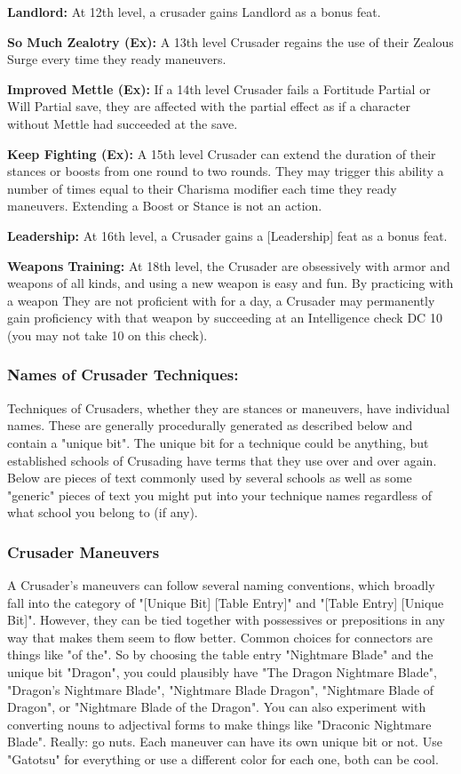 \textbf{Landlord:} At 12th level, a crusader gains Landlord as a bonus feat.

\textbf{So Much Zealotry (Ex):} A 13th level Crusader regains the use of their Zealous Surge every time they ready maneuvers.

\textbf{Improved Mettle (Ex):} If a 14th level Crusader fails a Fortitude Partial or Will Partial save, they are affected with the partial effect as if a character without Mettle had succeeded at the save.

\textbf{Keep Fighting (Ex):} A 15th level Crusader can extend the duration of their stances or boosts from one round to two rounds. They may trigger this ability a number of times equal to their Charisma modifier each time they ready maneuvers. Extending a Boost or Stance is not an action.

\textbf{Leadership:} At 16th level, a Crusader gains a [Leadership] feat as a bonus feat.

\textbf{Weapons Training:} At 18th level, the Crusader are obsessively with armor and weapons of all kinds, and using a new weapon is easy and fun. By practicing with a weapon They are not proficient with for a day, a Crusader may permanently gain proficiency with that weapon by succeeding at an Intelligence check DC 10 (you may not take 10 on this check).

\subsubsection{Names of Crusader Techniques:}

Techniques of Crusaders, whether they are stances or maneuvers, have individual names. These are generally procedurally generated as described below and contain a "unique bit". The unique bit for a technique could be anything, but established schools of Crusading have terms that they use over and over again. Below are pieces of text commonly used by several schools as well as some "generic" pieces of text you might put into your technique names regardless of what school you belong to (if any).

\subsubsection{Crusader Maneuvers}

A Crusader's maneuvers can follow several naming conventions, which broadly fall into the category of "[Unique Bit] [Table Entry]" and "[Table Entry] [Unique Bit]". However, they can be tied together with possessives or prepositions in any way that makes them seem to flow better. Common choices for connectors are things like "of the". So by choosing the table entry "Nightmare Blade" and the unique bit "Dragon", you could plausibly have "The Dragon Nightmare Blade", "Dragon's Nightmare Blade", "Nightmare Blade Dragon", "Nightmare Blade of Dragon", or "Nightmare Blade of the Dragon". You can also experiment with converting nouns to adjectival forms to make things like "Draconic Nightmare Blade". Really: go nuts. Each maneuver can have its own unique bit or not. Use "Gatotsu" for everything or use a different color for each one, both can be cool.

